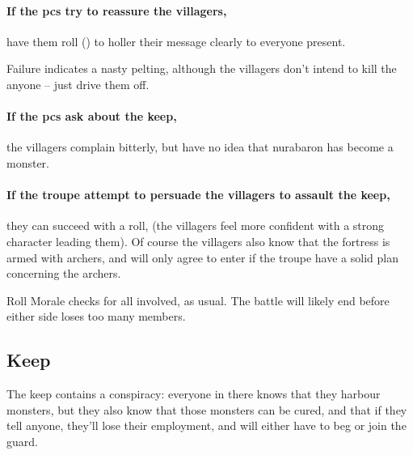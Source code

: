 \paragraph{If the \glspl{pc} try to reassure the villagers,}
have them roll  (\tn[9]) to holler their message clearly to everyone present.

Failure indicates a nasty pelting, although the villagers don't intend to kill the anyone -- just drive them off.

\paragraph{If the \glspl{pc} ask about the keep,}
the villagers complain bitterly, but have no idea that \gls{nurabaron} has become a monster.

\paragraph{If the troupe attempt to persuade the villagers to assault the keep,}
they can succeed with a  roll, \tn[10]
(the villagers feel more confident with a strong character leading them).
Of course the villagers also know that the fortress is armed with archers, and will only agree to enter if the troupe have a solid plan concerning the archers.

Roll Morale checks for all involved, as usual.%
The battle will likely end before either side loses too many members.


\subsection{ Keep}

The keep contains a conspiracy: everyone in there knows that they harbour monsters, but they also know that those monsters can be cured, and that if they tell anyone, they'll lose their employment, and will either have to beg or join the \gls{guard}.


